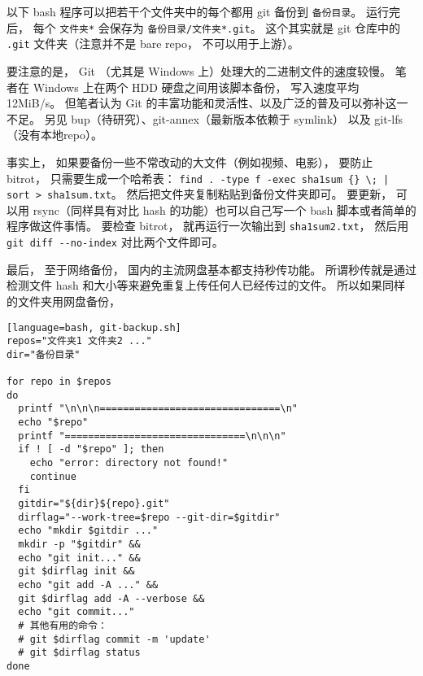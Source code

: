 
\begin{issues}
\issueDraft
\end{issues}


以下 bash 程序可以把若干个文件夹中的每个都用 git 备份到 \verb|备份目录|。 运行完后， 每个 \verb|文件夹*| 会保存为 \verb|备份目录/文件夹*.git|。 这个其实就是 git 仓库中的 \verb|.git| 文件夹（注意并不是 bare repo， 不可以用于上游）。

要注意的是， Git （尤其是 Windows 上）处理大的二进制文件的速度较慢。 笔者在 Windows 上在两个 HDD 硬盘之间用该脚本备份， 写入速度平均 12MiB/s。 但笔者认为 Git 的丰富功能和灵活性、以及广泛的普及可以弥补这一不足。 另见 bup（待研究）、git-annex（最新版本依赖于 symlink） 以及 git-lfs（没有本地repo）。

事实上， 如果要备份一些不常改动的大文件（例如视频、电影）， 要防止 bitrot， 只需要生成一个哈希表： \verb`find . -type f -exec sha1sum {} \; | sort > sha1sum.txt`。 然后把文件夹复制粘贴到备份文件夹即可。 要更新， 可以用 rsync（同样具有对比 hash 的功能）也可以自己写一个 bash 脚本或者简单的程序做这件事情。 要检查 bitrot， 就再运行一次输出到 \verb|sha1sum2.txt|， 然后用 \verb|git diff --no-index| 对比两个文件即可。

最后， 至于网络备份， 国内的主流网盘基本都支持秒传功能。 所谓秒传就是通过检测文件 hash 和大小等来避免重复上传任何人已经传过的文件。 所以如果同样的文件夹用网盘备份， 

\begin{lstlisting}[language=bash, git-backup.sh]
repos="文件夹1 文件夹2 ..."
dir="备份目录"

for repo in $repos
do
  printf "\n\n\n===============================\n"
  echo "$repo"
  printf "===============================\n\n\n"
  if ! [ -d "$repo" ]; then
    echo "error: directory not found!"
    continue
  fi
  gitdir="${dir}${repo}.git"
  dirflag="--work-tree=$repo --git-dir=$gitdir"
  echo "mkdir $gitdir ..."
  mkdir -p "$gitdir" &&
  echo "git init..." &&
  git $dirflag init &&
  echo "git add -A ..." &&
  git $dirflag add -A --verbose &&
  echo "git commit..."
  # 其他有用的命令：
  # git $dirflag commit -m 'update'
  # git $dirflag status
done
\end{lstlisting}
